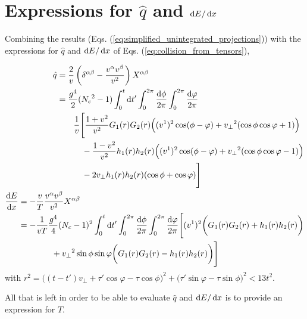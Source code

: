 \section{Expressions for $\hat{q}$ and $\mathop{}\!\mathrm{d} E / \mathop{}\!\mathrm{d} x$}


Combining the results (Eqs. (\ref{eq:simplified_unintegrated_projections})) with the expressions for $\hat{q}$ and $\mathop{}\!\mathrm{d} E / \mathop{}\!\mathrm{d} x$ of Eqs. (\ref{eq:collision_from_tensors}),

\begin{subequations}
\begin{align}
\begin{split}
	\hat{q} & = \frac{2}{v} \left(\delta^{\alpha \beta} - \frac{v^\alpha v^\beta}{v^2} \right) X^{\alpha\beta} \\
	& = \frac{g^4}{2}  ({N_c}^2 - 1) \int_0^t \diff t' \int_0^{2\pi}  \frac{\diff \phi}{2\pi}  \int_0^{2\pi} \frac{\diff \varphi}{2\pi} \\
& \qquad \frac{1}{v}\Bigg[ \frac{1+v^2}{v^2} G_1 (r) G_2 (r)  \Big( (v^1)^2 \cos(\phi-\varphi) + {v_\perp}^2 (\cos \phi \cos \varphi+1) \Big) \\
& \qquad \quad - \frac{1-v^2}{v^2} h_1(r) h_2(r) \Big( (v^1)^2 \cos (\phi-\varphi) + {v_\perp}^2 (\cos \phi \cos \varphi -1) \Big) \\
& \qquad \quad - 2 v_\perp h_1(r) h_2(r) (\cos \phi + \cos \varphi ) \Bigg]
\end{split} \label{eq:final_full_qhat} \\
\begin{split}
	\frac{\diff E}{\diff x} &= - \frac{v}{T}\frac{v^\alpha v^\beta}{v^2} X^{\alpha \beta} \\
	& = -\frac{1}{vT} \frac{g^4}{4} (N_c-1)^2  \int_0^t \diff t' \int_0^{2\pi} \frac{\diff \phi}{2\pi} \int_0^{2\pi} \frac{\diff \varphi}{2\pi}
  \Bigg[ (v^1)^2 \bigg(G_1(r) G_2(r) + h_1(r)  h_2(r) \bigg) \\
  & \qquad \qquad + {v_\perp}^2 \sin \phi \sin \varphi \bigg(G_1(r) G_2(r) - h_1(r)   h_2(r) \bigg) \Bigg]
\end{split}
\label{eq:final_full_dEdx}
\end{align}
\end{subequations}
with $r^2 = \big((t-t')v_\perp + \tau' \cos \varphi - \tau \cos \phi \big)^2 + \big(\tau' \sin \varphi - \tau \sin \phi \big)^2 < 13 t^2$. 

All that is left in order to be able to evaluate $\hat{q}$ and $\mathop{}\!\mathrm{d} E / \mathop{}\!\mathrm{d} x$ is to provide an expression for $T$.

